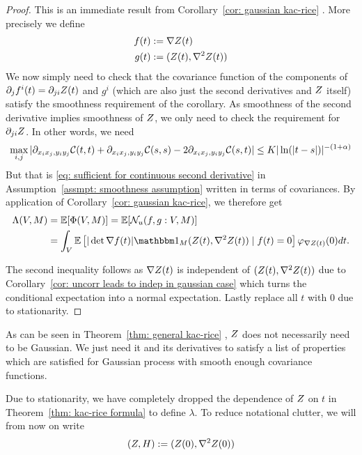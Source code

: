 \begin{proof}
	This is an immediate result from Corollary~\ref{cor: gaussian kac-rice}
	\parencite[Corollary~11.2.2]{adlerRandomFieldsGeometry2007}. More precisely
	we define
	\begin{align*}
		f(t) &:= \nabla Z(t)\\
		g(t) &:= (Z(t), \nabla^2 Z(t))
	\end{align*}
	We now simply need to check that the covariance function of the components of
	\(\partial_j f^i(t) = \partial_{ji} Z(t)\) and \(g^i\) (which are
	also just the second derivatives and \(Z\) itself) satisfy the smoothness
	requirement of the corollary. As smoothness of the second derivative implies
	smoothness of \(Z\), we only need to check the requirement for \(\partial_{ji} Z\).
	In other words, we need
	\[
		\max_{i,j}|\partial_{x_i x_j, y_i y_j}\mathcal{C}(t,t)
		+ \partial_{x_i x_j, y_i y_j}\mathcal{C}(s,s)
		-2\partial_{x_i x_j, y_i y_j}\mathcal{C}(s,t)| \le K |\ln(|t-s|)|^{-(1+\alpha)}
	\]
	But that is \eqref{eq: sufficient for continuous second derivative} in
	Assumption~\ref{assmpt: smoothness assumption} written in terms of
	covariances. By application
	of Corollary~\ref{cor: gaussian kac-rice}, we therefore get
	\begin{align*}
		\Lambda(\Vol, M) 
		&= \E[\crit(\Vol, M)]
		= \E[\level(f, g: \Vol, M)]\\
		&= \int_\Vol \E\left[
			|\det \nabla f(t)| \ind_M(\rf(t), \nabla^2\rf(t)) \mid f(t) = 0
		\right] \density_{\nabla\rf(t)}(0)dt.
	\end{align*}
	
	
	The second inequality follows as \(\nabla Z(t)\) is independent of
	\((Z(t),\nabla^2Z(t))\) due to Corollary~\ref{cor: uncorr leads to indep
	in gaussian case} which turns the conditional expectation into a normal
	expectation. Lastly replace all \(t\) with \(0\) due to stationarity.
\end{proof}
\begin{remark}
	As can be seen in Theorem~\ref{thm: general kac-rice} \parencite[Theorem
	11.2.1]{adlerRandomFieldsGeometry2007}, \(Z\) does not necessarily
	need to be Gaussian. We just need it and its derivatives to satisfy a
	list of properties which are satisfied for Gaussian process with
	smooth enough covariance functions.
\end{remark}

Due to stationarity, we have completely dropped the dependence of \(Z\) on
\(t\) in Theorem~\ref{thm: kac-rice formula} to define \(\lambda\). To reduce
notational clutter, we will from now on write
\[
	(Z,H):= (Z(0), \nabla^2Z(0))
\]

